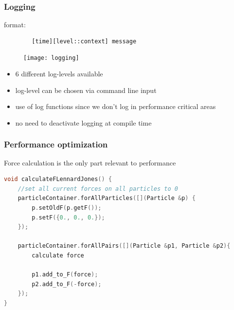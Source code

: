 \begin{frame}[fragile]
	\frametitle{Logging}
	\large
	format:
	\begin{lstlisting}
		[time][level::context] message
	\end{lstlisting}
	
	\begin{figure}
		\centering
		\texttt{[image: logging]}
		\label{fig:logging}
	\end{figure}
	
	
	\begin{itemize}
		\item 6 different log-levels available
		\item log-level can be chosen via command line input
		\item use of log functions since we don't log in performance critical areas
		\item no need to deactivate logging at compile time
	\end{itemize}
\end{frame}

\begin{frame}[fragile]
	\frametitle{Performance optimization}
	\large
	Force calculation is the only part relevant to performance
	\begin{lstlisting}[language=C++]
    void calculateFLennardJones() {
	//set all current forces on all particles to 0
	particleContainer.forAllParticles([](Particle &p) {
		p.setOldF(p.getF());
		p.setF({0., 0., 0.});
	});
	
	particleContainer.forAllPairs([](Particle &p1, Particle &p2){
		calculate force 
		
		p1.add_to_F(force);
		p2.add_to_F(-force);
	});
}

	\end{lstlisting}

\end{frame}

